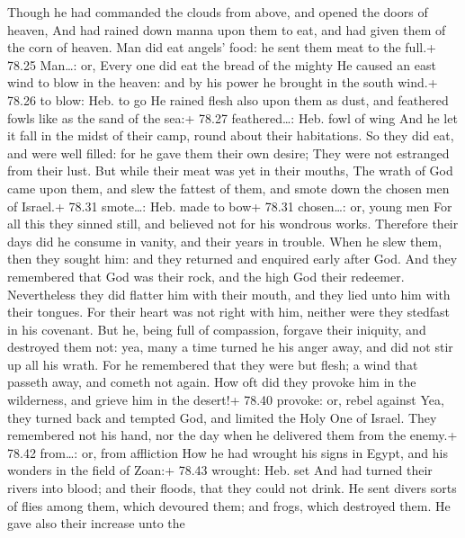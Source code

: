  Though he had commanded the clouds from above, and opened
the doors of heaven,  And had rained down manna upon them
to eat, and had given them of the corn of heaven.  Man did
eat angels' food: he sent them meat to the full.+ 78.25 Man\ldots: or,
Every one did eat the bread of the mighty  He caused an
east wind to blow in the heaven: and by his power he brought in the
south wind.+ 78.26 to blow: Heb. to go  He rained flesh
also upon them as dust, and feathered fowls like as the sand of the
sea:+ 78.27 feathered\ldots: Heb. fowl of wing  And he let
it fall in the midst of their camp, round about their habitations.
 So they did eat, and were well filled: for he gave them
their own desire;  They were not estranged from their lust.
But while their meat was yet in their mouths,  The wrath of
God came upon them, and slew the fattest of them, and smote down the
chosen men of Israel.+ 78.31 smote\ldots: Heb. made to bow+ 78.31
chosen\ldots: or, young men  For all this they sinned
still, and believed not for his wondrous works.  Therefore
their days did he consume in vanity, and their years in trouble.
 When he slew them, then they sought him: and they returned
and enquired early after God.  And they remembered that God
was their rock, and the high God their redeemer. 
Nevertheless they did flatter him with their mouth, and they lied unto
him with their tongues.  For their heart was not right with
him, neither were they stedfast in his covenant.  But he,
being full of compassion, forgave their iniquity, and destroyed them
not: yea, many a time turned he his anger away, and did not stir up all
his wrath.  For he remembered that they were but flesh; a
wind that passeth away, and cometh not again.  How oft did
they provoke him in the wilderness, and grieve him in the desert!+ 78.40
provoke: or, rebel against  Yea, they turned back and
tempted God, and limited the Holy One of Israel.  They
remembered not his hand, nor the day when he delivered them from the
enemy.+ 78.42 from\ldots: or, from affliction  How he had
wrought his signs in Egypt, and his wonders in the field of Zoan:+ 78.43
wrought: Heb. set  And had turned their rivers into blood;
and their floods, that they could not drink.  He sent
divers sorts of flies among them, which devoured them; and frogs, which
destroyed them.  He gave also their increase unto the

